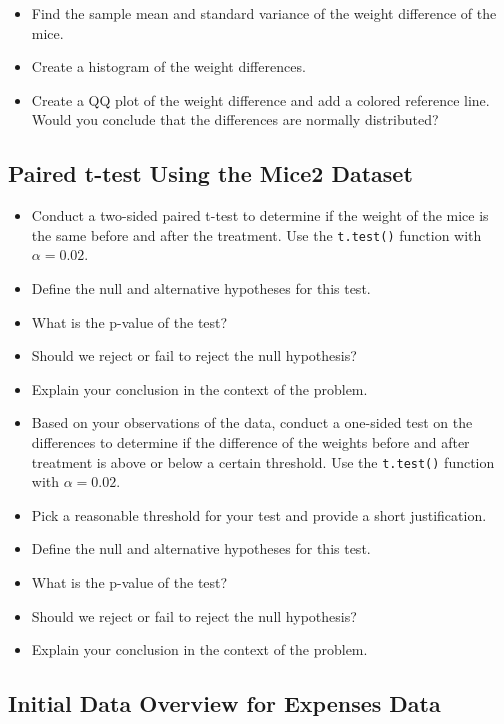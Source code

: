 \documentclass{article}
\begin{document}
\begin{itemize}
    \item Find the sample mean and standard variance of the weight difference of the mice.
    \item Create a histogram of the weight differences.
    \item Create a QQ plot of the weight difference and add a colored reference line. Would you conclude that the differences are normally distributed?
\end{itemize}

\subsection*{Paired t-test Using the Mice2 Dataset}

\begin{itemize}
    \item Conduct a two-sided paired t-test to determine if the weight of the mice is the same before and after the treatment. Use the \texttt{t.test()} function with $\alpha = 0.02$.
    \item Define the null and alternative hypotheses for this test.
    \item What is the p-value of the test?
    \item Should we reject or fail to reject the null hypothesis?
    \item Explain your conclusion in the context of the problem.
    \item Based on your observations of the data, conduct a one-sided test on the differences to determine if the difference of the weights before and after treatment is above or below a certain threshold. Use the \texttt{t.test()} function with $\alpha = 0.02$.
    \item Pick a reasonable threshold for your test and provide a short justification.
    \item Define the null and alternative hypotheses for this test.
    \item What is the p-value of the test?
    \item Should we reject or fail to reject the null hypothesis?
    \item Explain your conclusion in the context of the problem.
\end{itemize}
\subsection*{Initial Data Overview for Expenses Data}
\end{document}
